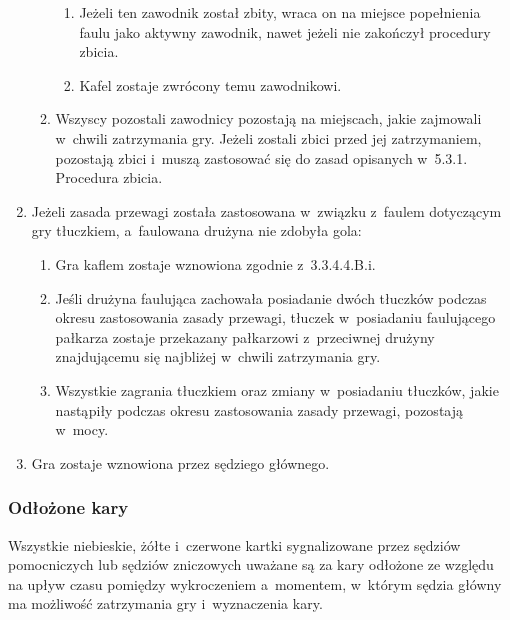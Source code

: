 \documentclass[12pt,a4paper]{article}
\begin{document}
\begin{enumerate}
\begin{enumerate}
		            \begin{enumerate}
			            \item
			                  Jeżeli ten zawodnik został zbity, wraca on na miejsce popełnienia
			                  faulu jako aktywny zawodnik, nawet jeżeli nie zakończył
			                  procedury zbicia.
			            \item
			                  Kafel zostaje zwrócony temu zawodnikowi.
		            \end{enumerate}
		      \item
		            Wszyscy pozostali zawodnicy pozostają na miejscach, jakie zajmowali
		            w~chwili zatrzymania gry. Jeżeli zostali zbici przed jej
		            zatrzymaniem, pozostają zbici i~muszą zastosować się do zasad
		            opisanych w~5.3.1. Procedura zbicia.
	      \end{enumerate}
	\item
	      Jeżeli zasada przewagi została zastosowana w~związku z~faulem
	      dotyczącym gry tłuczkiem, a~faulowana drużyna nie zdobyła gola:

	      \begin{enumerate}
		      \item
		            Gra kaflem zostaje wznowiona zgodnie z~3.3.4.4.B.i.
		      \item
		            Jeśli drużyna faulująca zachowała posiadanie dwóch tłuczków podczas
		            okresu zastosowania zasady przewagi, tłuczek w~posiadaniu
		            faulującego pałkarza zostaje przekazany pałkarzowi z~przeciwnej
		            drużyny znajdującemu się najbliżej w~chwili zatrzymania gry.
		      \item
				Wszystkie zagrania tłuczkiem oraz zmiany w~posiadaniu tłuczków, jakie nastąpiły
				podczas okresu zastosowania zasady przewagi, pozostają w~mocy.
	      \end{enumerate}
	\item
	      Gra zostaje wznowiona przez sędziego głównego.
\end{enumerate}

\subsubsection{Odłożone kary}

Wszystkie niebieskie, żółte i~czerwone kartki sygnalizowane przez
sędziów pomocniczych lub sędziów zniczowych uważane są za kary odłożone
ze względu na upływ czasu pomiędzy wykroczeniem a~momentem, w~którym
sędzia główny ma możliwość zatrzymania gry i~wyznaczenia kary.
\end{document}
